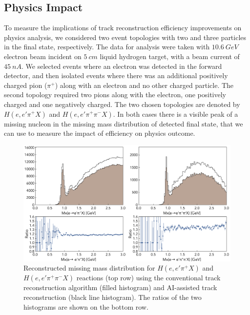 \subsection{Physics Impact}

To measure the implications of track reconstruction efficiency improvements on physics analysis, 
we considered two event topologies with two and three particles in the final state, respectively. 
The data for analysis were taken with $10.6~GeV$ electron beam incident on $5~cm$ liquid 
hydrogen target, with a beam current of $45~nA$. 
We selected events where an electron was detected in the forward detector, and then isolated 
events where there was an additional positively charged pion ($\pi^+$) along with an electron 
and no other charged particle. The second topology required two pions along with the electron, 
one positively charged and one negatively charged. The two chosen topologies are denoted by 
$H(e,e'\pi^+X)$ and $H(e,e'\pi^+\pi^-X)$. In both cases there is a visible peak of a missing nucleon
in the missing mass distribution of detected final state, that we can use to measure the impact 
of efficiency on physics outcome. 

 \begin{figure}[!ht]
\begin{center}
 \includegraphics[width=6.0in]{images/physics_scan.pdf}
\caption {Reconstructed missing mass distribution for $H(e,e'\pi^+X)$ and $H(e,e'\pi^+\pi^-X)$ 
reactions (top row) using the conventional track reconstruction algorithm (filled histogram) and  
AI-assisted track reconstruction (black line histogram). The ratios of the two histograms are shown 
on the bottom row. }
 \label{physics:outcome}
 \end{center}
\end{figure}

